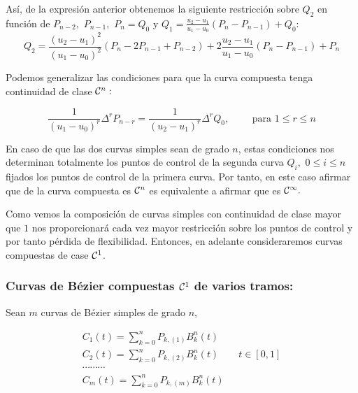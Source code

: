 \documentclass[twoside]{report}
\begin{document}
\vspace{0.2cm}

Así, de la expresión anterior obtenemos la siguiente restricción sobre $Q_2$ en función de  $P_{n-2},$ $P_{n-1},$ $P_n=Q_0$ y $\displaystyle Q_1=\frac{u_2-u_1}{u_1-u_0}(P_n-P_{n-1})+Q_0$:
$$Q_2=\frac{(u_2-u_1)^2}{(u_1-u_0)^2}(P_n-2P_{n-1}+P_{n-2})+2\frac{u_2-u_1}{u_1-u_0}(P_n-P_{n-1})+P_n$$


Podemos generalizar las condiciones para que la curva compuesta tenga continuidad de clase ${\cal C}^n:$

$$\frac{1}{(u_1-u_0)^r}\Delta^rP_{n-r}=\frac{1}{(u_2-u_1)^r}\Delta^r Q_0, \quad \quad \mbox{ para } 1\leq r\leq n$$

En caso de que las dos curvas simples sean de grado $n$, estas condiciones nos determinan totalmente los puntos de control de la segunda curva $Q_i,$ \quad $0\leq i\leq n$ fijados los puntos de control de la primera curva. Por tanto, en este caso afirmar que de la curva compuesta es ${\cal C}^n$ es equivalente a afirmar que es ${\cal C}^{\infty}.$

\vspace{0.2cm}

Como vemos la composición de curvas simples con continuidad de clase mayor que $1$ nos proporcionará cada vez mayor restricción sobre los puntos de control y por tanto pérdida de flexibilidad. Entonces, en adelante consideraremos curvas compuestas de case ${\cal C}^1$.

\subsubsection{Curvas de Bézier compuestas ${\cal C}^1$ de varios tramos:}

Sean $m$ curvas de Bézier simples de grado $n$,

$$\begin{array}{l}
C_1(t)=\sum_{k=0}^n P_{k, (1)} B_k^n(t)\\
C_2(t)=\sum_{k=0}^n P_{k, (2)} B_k^n(t) \quad \quad t\in [0,1]\\
\cdots \cdots \cdots\\
C_m(t)=\sum_{k=0}^n P_{k, (m)} B_k^n(t)\\
\end{array}$$
\end{document}
